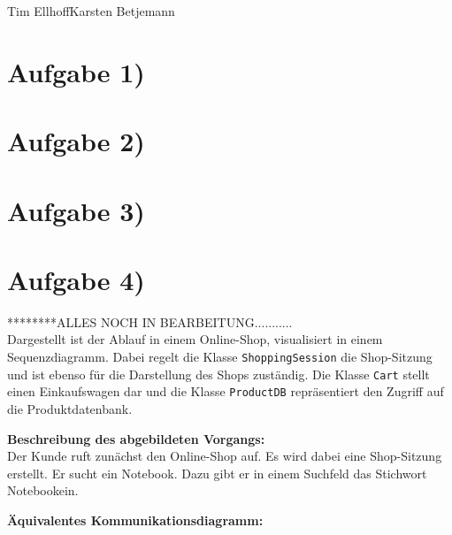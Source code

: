 \documentclass{swp1}
\begin{document}
          {Tim Ellhoff}{Karsten Betjemann}{}
          
\section*{Aufgabe 1)}
\section*{Aufgabe 2)}
\section*{Aufgabe 3)}
\section*{Aufgabe 4)}

********ALLES NOCH IN BEARBEITUNG...........\\

Dargestellt ist der Ablauf in einem Online-Shop, visualisiert in einem Sequenzdiagramm. Dabei regelt die Klasse \texttt{ShoppingSession} die Shop-Sitzung und ist ebenso für die Darstellung des Shops zuständig. Die Klasse \texttt{Cart} stellt einen Einkaufswagen dar und die Klasse \texttt{ProductDB} repräsentiert den Zugriff auf die Produktdatenbank.

\textbf{Beschreibung des abgebildeten Vorgangs:}\\
Der Kunde ruft zunächst den Online-Shop auf. Es wird dabei eine Shop-Sitzung erstellt. Er sucht ein Notebook. Dazu gibt er in einem Suchfeld das Stichwort \glqq Notebook\grqq ein. 

\textbf{Äquivalentes Kommunikationsdiagramm:}\\
\end{document}
